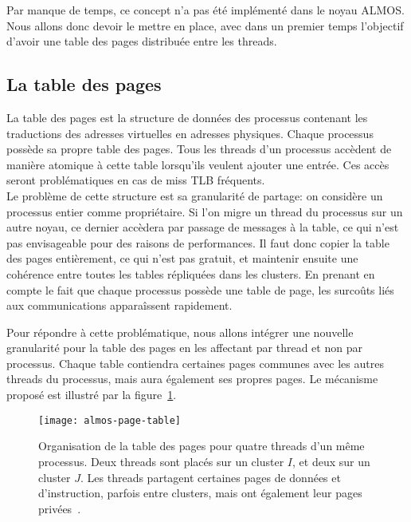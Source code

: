       Par manque de temps, ce concept n'a pas été implémenté dans le noyau
      ALMOS. Nous allons donc devoir le mettre en place, avec dans un premier
      temps l'objectif d'avoir une table des pages distribuée entre les threads.


    \subsection{La table des pages}

      La table des pages est la structure de données des processus contenant les
      traductions des adresses virtuelles en adresses physiques. Chaque
      processus possède sa propre table des pages. Tous les threads d'un
      processus accèdent de manière atomique à cette table lorsqu'ils veulent
      ajouter une entrée. Ces accès seront problématiques en cas de miss TLB
      fréquents.\\

      Le problème de cette structure est sa granularité de partage: on considère
      un processus entier comme propriétaire. Si l'on migre un thread du
      processus sur un autre noyau, ce dernier accèdera par passage de messages
      à la table, ce qui n'est pas envisageable pour des raisons de
      performances. Il faut donc copier la table des pages entièrement, ce qui
      n'est pas gratuit, et maintenir ensuite une cohérence entre toutes les
      tables répliquées dans les clusters. En prenant en compte le fait que
      chaque processus possède une table de page, les surcoûts liés aux
      communications apparaîssent rapidement.

      Pour répondre à cette problématique, nous allons intégrer une nouvelle
      granularité pour la table des pages en les affectant par thread et non par
      processus. Chaque table contiendra certaines pages communes avec les
      autres threads du processus, mais aura également ses propres pages. Le
      mécanisme proposé est illustré par la figure~\ref{fig:almos-page-table}.

      \begin{figure}[ht]
        \centering
        \texttt{[image: almos-page-table]}
        \caption{Organisation de la table des pages pour quatre threads d'un
          même processus. Deux threads sont placés sur un cluster $I$, et deux
          sur un cluster $J$. Les threads partagent certaines pages de données
          et d'instruction, parfois entre clusters, mais ont également leur
          pages privées~\citep{almaless2014universite}.}
        \label{fig:almos-page-table}
      \end{figure}

